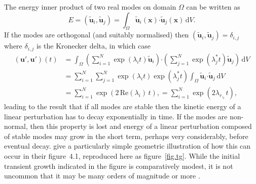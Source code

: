 \documentclass[11pt,a4paper]{report}
\newcommand\cd{\mathrm{d}}
\newcommand\wt[1]{\widetilde{#1}}
\newcommand{\eg}{e.g.\ }
\newcommand\upert{{\bm{u}'}}
\newcommand\xvec{\bm{x}}
\newcommand\uvec{\bm{u}}
\begin{document}
The energy inner product of two real modes on domain $\Omega$ can be
written as
\begin{equation}
E=(\wt{\bm{u}}_i, \wt{\bm{u}}_j) = \int_\Omega \wt{\bm{u}}_i
  (\xvec)\bm{\cdot} \wt{\bm{u}}_j(\xvec)\,\cd V.
\label{eq.inner}
\end{equation}
If the modes are orthogonal (and suitably normalised) then
$(\wt{\bm{u}}_i, \wt{\bm{u}}_j)=\delta_{i,j}$ where $\delta_{i,j}$ is
the Kronecker delta, in which case
\begin{align}
\nonumber (\upert,\upert)(t)&=
\int_\Omega\left(\sum_{i=1}^N\exp(\lambda_i t)
\wt{\uvec}_i\right)\bm{\cdot} \left(\sum_{j=1}^N\exp(\lambda_j^\ast
t)\wt{\uvec}_j\right)\,\cd V\\ \nonumber &
=\sum_{i=1}^N\sum_{j=1}^N \exp(\lambda_i t)\exp(\lambda_j^\ast t)
\int_\Omega\wt{\uvec}_i\bm{\cdot}\wt{\uvec}_j\,\cd
V\\ &=\sum_{i=1}^N\exp(2\,\text{Re}(\lambda_i)\,
t),=\sum_{i=1}^N\exp(2\lambda_{r,_i}t),
\end{align}
leading to the result that if all modes are stable then the kinetic
energy of a linear perturbation has to decay exponentially in time.
If the modes are non-normal, then this property is lost and energy of
a linear perturbation composed of stable modes may grow in the short
term, perhaps very considerably, before eventual decay.
\citet{schmid01} give a particularly simple geometric illustration of
how this can occur in their figure~4.1, reproduced here as
figure~\ref{fig.tg}.  While the initial transient growth indicated in
the figure is comparatively modest, it is not uncommon that it may be
many orders of magnitude or more \citep[\eg an energy growth factor of
  $O(10^{25})$ was recorded in][such large linear growths would make
  transition basically inevitable in reality]{msb11}.
\end{document}

